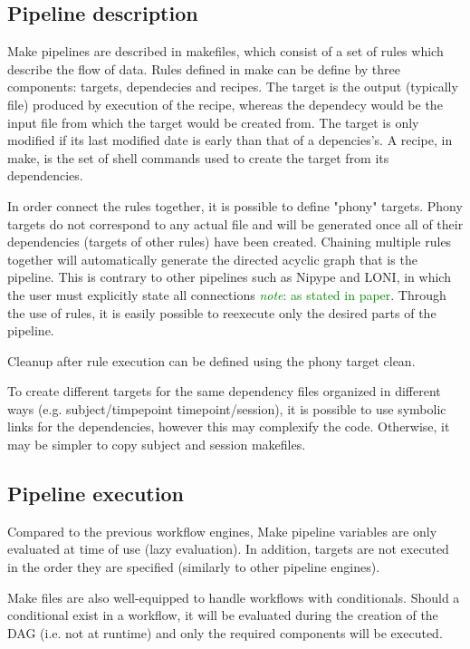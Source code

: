 \documentclass{report}
\newcommand{\note}[1]{\textcolor{green}{\textit{note}: #1}}
\begin{document}
 
        \subsection{Pipeline description}
        Make pipelines are described in makefiles, which consist of a set of
rules which describe the flow of data. Rules defined in make can be define by three
components: targets, dependecies and recipes. The target is the output
(typically file) produced by execution of the recipe, whereas the dependecy
would be the input file from which the target would be created from. The target
is only modified if its last modified date is early than that of a depencies's.
A recipe, in make, is the set of shell commands used to create the target from
its dependencies. 

In order connect the rules together, it is possible to define "phony" targets.
Phony targets do not correspond to any actual file and will be generated once
all of their dependencies (targets of other rules) have been
created. Chaining multiple rules together will automatically generate the directed acyclic
graph that is the pipeline. This is contrary to other pipelines such as Nipype
and LONI, in which the user must explicitly state all connections \note{as
stated in paper}. Through the use of rules, it is easily possible to reexecute
only the desired parts of the pipeline.

Cleanup after rule execution can be defined using the phony target
clean.

To create different targets for the same dependency files organized in different
ways (e.g. subject/timpepoint timepoint/session), it is possible to use symbolic
links for the dependencies, however this may complexify the code. Otherwise, it
may be simpler to copy subject and session makefiles.

        \subsection{Pipeline execution}

        Compared to the previous workflow engines, Make pipeline variables are
only evaluated at time of use (lazy evaluation). In addition, targets are not
executed in the order they are specified (similarly to other pipeline engines).

Make files are also well-equipped to handle workflows with conditionals. Should
a conditional exist in a workflow, it will be evaluated during the creation of
the DAG (i.e. not at runtime) and only the required components will be executed. 
\end{document}
